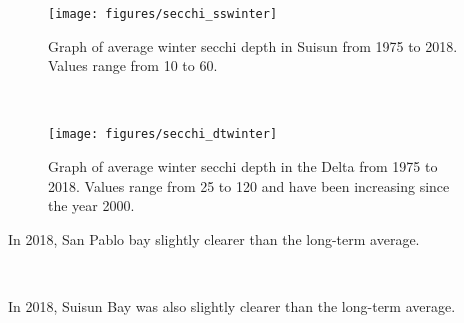 \documentclass[
]{book}
\begin{document}
\begin{panel-grid}
\begin{columns-nocenter}
\begin{column800}

\begin{expand}

\begin{figure}
\texttt{[image: figures/secchi\_sswinter]} \caption{Graph of average winter secchi depth in Suisun from 1975 to 2018. Values range from 10 to 60.}\label{fig:unnamed-chunk-147}
\end{figure}

\end{expand}

\end{column800}

\begin{column40}

~

\end{column40}

\begin{column800}

\begin{expand}

\begin{figure}
\texttt{[image: figures/secchi\_dtwinter]} \caption{Graph of average winter secchi depth in the Delta from 1975 to 2018. Values range from 25 to 120 and have been increasing since the year 2000.}\label{fig:unnamed-chunk-148}
\end{figure}

\end{expand}

\end{column800}

\end{columns-nocenter}

\begin{columns-nocenter}

\begin{column800}

In 2018, San Pablo bay slightly clearer than the long-term average.

\end{column800}

\begin{column40}

~

\end{column40}

\begin{column800}

In 2018, Suisun Bay was also slightly clearer than the long-term average.


\end{column800}
\end{columns-nocenter}
\end{panel-grid}
\end{document}
